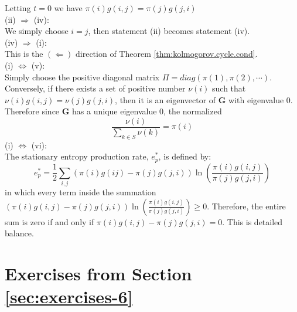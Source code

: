 \documentclass[12pt]{book}
\numberwithin{equation}{chapter}
\theoremstyle{plain}
\numberwithin{theorem}{section}
\theoremstyle{definition}
\numberwithin{exercise}{chapter}
\newcommand{\<}{\langle}
\renewcommand{\>}{\rangle}
\renewcommand{\(}{\left(}
\renewcommand{\)}{\right)}
\renewcommand{\[}{\left[}
\renewcommand{\]}{\right]}
\newcommand\Gv{\pmb{G}}
\begin{document}
Letting $t=0$ we have $\pi(i)g(i,j) = \pi(j)g(j,i)$\\
(ii) $\Rightarrow$ (iv):\\
We simply choose $i=j$, then statement (ii) becomes statement (iv).\\
(iv) $\Rightarrow$ (i):\\
This is the $(\Leftarrow)$ direction of Theorem \ref{thm:kolmogorov.cycle.cond}.\\
(i) $\Leftrightarrow$ (v):\\
Simply choose the positive diagonal matrix $\Pi = diag(\pi(1), \pi(2), \cdots)$. Conversely, if there exists a set of positive number $\nu(i)$ such that $\nu(i)g(i,j) = \nu(j)g(j,i)$, then it is an eigenvector of $\Gv$ with eigenvalue $0$. Therefore since $\Gv$ has a unique eigenvalue $0$, the normalized
$$ \frac{\nu(i)}{\sum_{k\in S} \nu(k)} = \pi(i) $$
(i) $\Leftrightarrow$ (vi):\\
The stationary entropy production rate, $e^*_p $, is defined by:
$$e^*_p = \frac{1}{2} \sum_{i, j} \left(\pi(i) g(ij)- \pi(j)g(j, i)\right) 
\ln\left(\frac{\pi(i) g(i,j)}{\pi(j)g(j, i)}\right)    $$
in which every term inside the summation $ \left( \pi(i) g(i,j) - \pi(j) g(j,i) \right) \ln \left( \frac{\pi(i) g(i, j)}{\pi(j)g(j, i)} \right)  \geq 0 $. Therefore, the entire sum is zero if and only if $\pi(i) g(i,j) - \pi(j) g(j, i) =0$. This is detailed balance. 







\section{Exercises from Section \ref{sec:exercises-6}}
\end{document}
